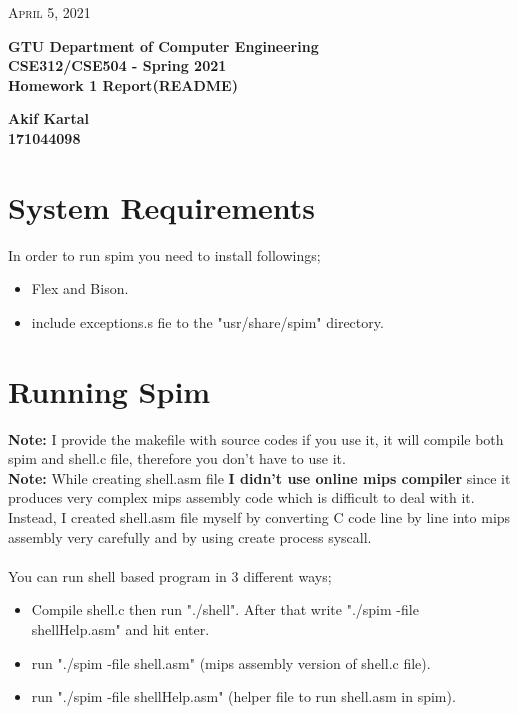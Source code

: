 \documentclass{article}
\begin{document}
\begin{titlepage}

	\begin{flushright}
	\textsc{\large April 5, 2021} \\
	\end{flushright}
	\begin{center}
	\Large{\bfseries GTU Department of Computer Engineering \\ CSE312/CSE504 - Spring 2021 \\ Homework 1 Report(README)  } \\
	\end{center}
	\vspace*{\fill}
	\begin{center}
	\Large{\bfseries Akif Kartal \\ 171044098 }
	\end{center}
	\vspace*{\fill}

\end{titlepage}

\cleardoublepage
\section{System Requirements}
In order to run spim you need to install followings;
\begin{itemize}
	\item Flex and Bison.
	\item include exceptions.s fie to the "usr/share/spim" directory.
\end{itemize}

\section{Running Spim}
\textbf{Note:} I provide the makefile with source codes if you use it, it will compile both spim and shell.c file, therefore you don't have to use it.\\
\textbf{Note:} While creating shell.asm file \textbf{I didn't use online mips compiler} since it produces very complex mips assembly code which is difficult to deal with it. Instead, I created shell.asm file myself by converting C code line by line into mips assembly very carefully and by using create process syscall.\\ \\
You can run shell based program in 3 different ways;
\begin{itemize}
	\item Compile shell.c then run "./shell". After that write "./spim -file shellHelp.asm" and hit enter.
	\item run "./spim -file shell.asm" (mips assembly version of shell.c file).
	\item run "./spim -file shellHelp.asm" (helper file to run shell.asm in spim).
\end{itemize}
\end{document}
